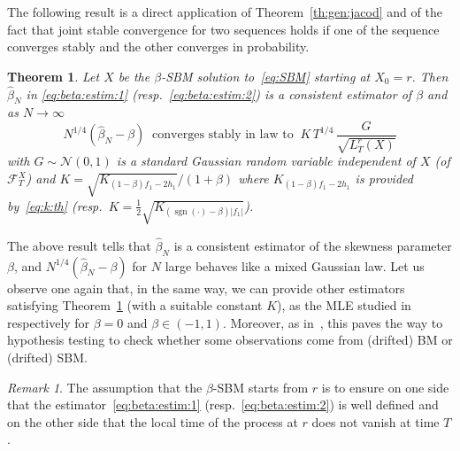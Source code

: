 \documentclass[12pt]{article}
\numberwithin{equation}{section}
\newtheorem{theorem}{Theorem}
\theoremstyle{definition}
\theoremstyle{remark}
\newtheorem{remark}{Remark}
\DeclareMathOperator{\sgn}{sgn}
\begin{document}
The following result is a direct application of Theorem~\ref{th:gen:jacod} and of the fact that joint stable convergence for two sequences holds if one of the sequence converges stably and the other converges in probability. 

\begin{theorem} \label{th:skew:estim}
Let $X$ be the $\beta$-SBM solution to~\eqref{eq:SBM} starting at $X_0=r$.
%
Then $\hat{\beta}_N$ in \eqref{eq:beta:estim:1} (resp.~\eqref{eq:beta:estim:2}) is a consistent estimator of $\beta$ and as $N\to\infty$
\begin{equation}
	N^{1/4} \left( \hat{\beta}_N  -\beta \right)  \ \text{ converges stably in law to } \  K \, T^{1/4} \, \frac{G}{\sqrt{L^r_T(X)}} 
\end{equation}
with $G\sim \mathcal N(0,1)$ is a standard Gaussian random variable independent of $X$ (of $\mathcal F_T^X$) and $K={\sqrt{K_{(1-\beta) f_1 -2 h_1}}}/{(1+\beta)}$ where $K_{(1-\beta)f_1-2 h_1}$ is provided by~\eqref{eq:k:th} (resp.~$K=\frac12 \sqrt{K_{(\sgn(\cdot) -\beta)|f_1|}}$).
\end{theorem}
\noindent The above result tells that $\hat{\beta}_N$ is a consistent estimator of the skewness parameter $\beta$, and $N^{1/4}(\hat{\beta}_N -\beta)$ for $N$ large behaves like a mixed Gaussian law.
Let us observe one again that, in the same way, we can provide other estimators satisfying Theorem~\ref{th:skew:estim} (with a suitable constant $K$), as the MLE studied in~\cite{lmt,lm23} respectively for $\beta=0$ and $\beta \in (-1,1)$. 
Moreover, as in~\cite{lmt}, this paves the way to hypothesis testing to check whether some observations come from (drifted) BM or (drifted) SBM.



\begin{remark}
The assumption that the $\beta$-SBM starts from $r$ is to ensure on one side that the estimator~\eqref{eq:beta:estim:1} (resp.~\eqref{eq:beta:estim:2}) is well defined and on the other side that the local time of the process at $r$ does not vanish at time $T$.
\end{remark}
\end{document}
